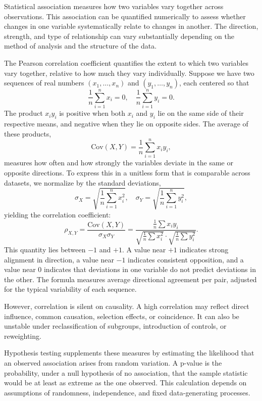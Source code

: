 Statistical association measures how two variables vary together across observations. This association can be quantified numerically to assess whether changes in one variable systematically relate to changes in another. The direction, strength, and type of relationship can vary substantially depending on the method of analysis and the structure of the data.

The Pearson correlation coefficient quantifies the extent to which two variables vary together, relative to how much they vary individually. Suppose we have two sequences of real numbers $(x_1, \dots, x_n)$ and $(y_1, \dots, y_n)$, each centered so that
\[
\frac{1}{n} \sum_{i=1}^n x_i = 0, \quad \frac{1}{n} \sum_{i=1}^n y_i = 0.
\]
The product $x_i y_i$ is positive when both $x_i$ and $y_i$ lie on the same side of their respective means, and negative when they lie on opposite sides. The average of these products,
\[
\mathrm{Cov}(X,Y) = \frac{1}{n} \sum_{i=1}^n x_i y_i,
\]
measures how often and how strongly the variables deviate in the same or opposite directions. To express this in a unitless form that is comparable across datasets, we normalize by the standard deviations,
\[
\sigma_X = \sqrt{\frac{1}{n} \sum_{i=1}^n x_i^2}, \quad \sigma_Y = \sqrt{\frac{1}{n} \sum_{i=1}^n y_i^2},
\]
yielding the correlation coefficient:
\[
\rho_{X,Y} = \frac{\mathrm{Cov}(X,Y)}{\sigma_X \sigma_Y} = \frac{\frac{1}{n} \sum x_i y_i}{\sqrt{\frac{1}{n} \sum x_i^2} \cdot \sqrt{\frac{1}{n} \sum y_i^2}}.
\]
This quantity lies between $-1$ and $+1$. A value near $+1$ indicates strong alignment in direction, a value near $-1$ indicates consistent opposition, and a value near $0$ indicates that deviations in one variable do not predict deviations in the other. The formula measures average directional agreement per pair, adjusted for the typical variability of each sequence.

However, correlation is silent on causality. A high correlation may reflect direct influence, common causation, selection effects, or coincidence. It can also be unstable under reclassification of subgroups, introduction of controls, or reweighting.

Hypothesis testing supplements these measures by estimating the likelihood that an observed association arises from random variation. A p-value is the probability, under a null hypothesis of no association, that the sample statistic would be at least as extreme as the one observed. This calculation depends on assumptions of randomness, independence, and fixed data-generating processes.

